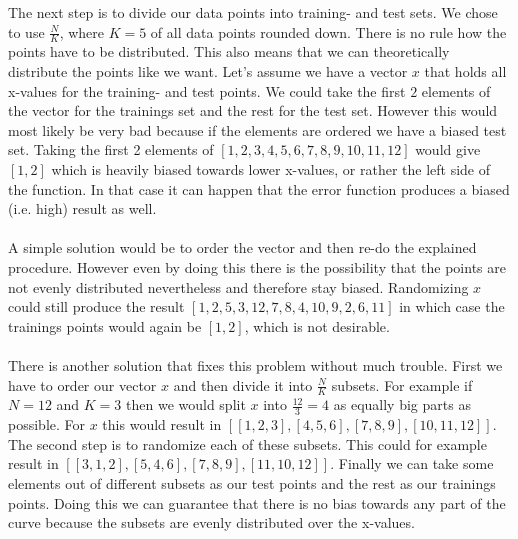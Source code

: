 \documentclass{article}
\begin{document}
\FloatBarrier


\noindent The next step is to divide our data points into training- and test sets. We chose to use $\frac{N}{K}$, where $K = 5$ of all data points rounded down. There is no rule how the points have to be distributed. This also means that we can theoretically distribute the points like we want. Let's assume we have a vector $x$ that holds all x-values for the training- and test points. We could take the first $2$ elements of the vector for the trainings set and the rest for the test set. However this would most likely be very bad because if the elements are ordered we have a biased test set. Taking the first 2 elements of $[1,2,3,4,5,6,7,8,9,10,11,12]$ would give $[1,2]$ which is heavily biased towards lower x-values, or rather the left side of the function. In that case it can happen that the error function produces a biased (i.e. high) result as well. \\
\\
A simple solution would be to order the vector and then re-do the explained procedure. However even by doing this there is the possibility that the points are not evenly distributed nevertheless and therefore stay biased. Randomizing $x$ could still produce the result $[1,2,5,3,12,7,8,4,10,9,2,6,11]$ in which case the trainings points would again be $[1,2]$, which is not desirable. \\
\\
There is another solution that fixes this problem without much trouble. First we have to order our vector $x$ and then divide it into $\frac{N}{K}$ subsets. For example if $N = 12$ and $K = 3$ then we would split $x$ into $\frac{12}{3} = 4$ as equally big parts as possible. For $x$ this would result in $[[1,2,3],[4,5,6],[7,8,9],[10,11,12]]$. The second step is to randomize each of these subsets. This could for example result in $[[3,1,2],[5,4,6],[7,8,9],[11,10,12]]$. Finally we can take some elements out of different subsets as our test points and the rest as our trainings points. Doing this we can guarantee that there is no bias towards any part of the curve because the subsets are evenly distributed over the x-values.
\end{document}
